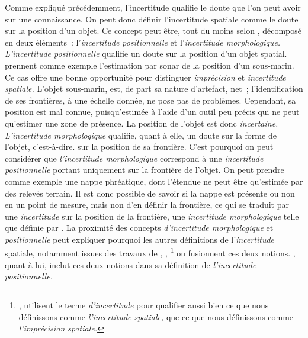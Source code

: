 Comme expliqué précédemment, l’incertitude qualifie le doute que l’on
peut avoir sur une connaissance. On peut donc définir l’incertitude
spatiale comme le doute sur la position d’un objet. Ce concept peut
être, tout du moins selon \textcite{Tossebro2002}, décomposé en deux
éléments : l’\emph{incertitude positionnelle} et l’\emph{incertitude
  morphologique.} \emph{L’incertitude positionnelle} qualifie un doute
sur la position d’un objet spatial. \textcite{Tossebro2008} prennent
comme exemple l’estimation par sonar de la position d’un
sous-marin. Ce cas offre une bonne opportunité pour distinguer
\emph{imprécision} et \emph{incertitude spatiale.} L’objet sous-marin,
est, de part sa nature d’artefact, net ; l’identification de ses
frontières, à une échelle donnée, ne pose pas de problèmes. Cependant,
sa position est mal connue, puisqu’estimée à l’aide d’un outil peu
précis qui ne peut qu’estimer une zone de présence. La position de
l’objet est donc \emph{incertaine.} \emph{L’incertitude morphologique}
qualifie, quant à elle, un doute sur la forme de l’objet,
c’est-à-dire. sur la position de sa frontière. C’est pourquoi on peut
considérer que \emph{l’incertitude morphologique} correspond à une
\emph{incertitude positionnelle} portant uniquement sur la frontière
de l’objet. On peut prendre comme exemple une nappe phréatique, dont
l’étendue ne peut être qu’estimée par des relevés terrain. Il est donc
possible de savoir si la nappe est présente ou non en un point de
mesure, mais non d’en définir la frontière, ce qui se traduit par une
\emph{incertitude} sur la position de la frontière, \ie une
\emph{incertitude morphologique} telle que définie par
\textcite{Tossebro2002,Tossebro2008}. La proximité des concepts
\emph{d’incertitude morphologique} et \emph{positionnelle} peut
expliquer pourquoi les autres définitions de l’\emph{incertitude}
spatiale, notamment issues des travaux de \textcite{Clementini2008},
\textcite{Lagacherie1996}, \textcite{Freksa1996}
\footnote{\textcite{Freksa1996}, utilisent le terme
  \emph{d’incertitude} pour qualifier aussi bien ce que nous
  définissons comme \emph{l’incertitude spatiale,} que ce que nous
  définissons comme \emph{l’imprécision spatiale.}}  ou
\textcite{Schneider1999} fusionnent ces deux
notions. \textcite{Dutton1992}, quant à lui, inclut ces deux notions
dans sa définition de \emph{l’incertitude positionnelle.}

